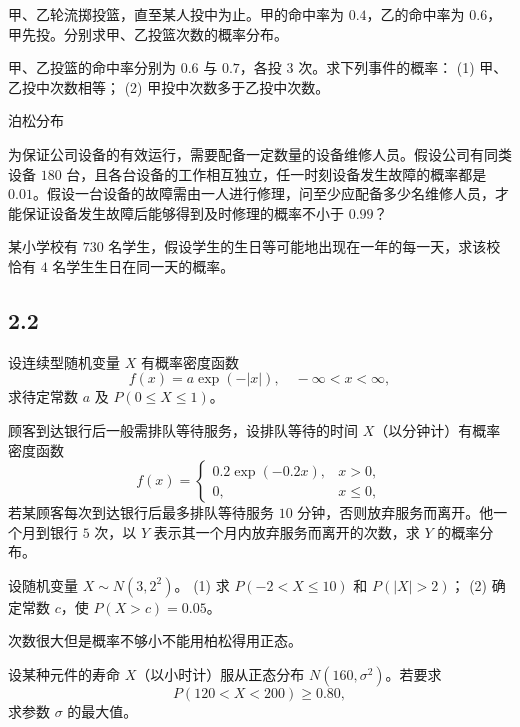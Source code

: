 \begin{homework}[2.5]
甲、乙轮流掷投篮，直至某人投中为止。甲的命中率为 $0.4$，乙的命中率为 $0.6$，甲先投。分别求甲、乙投篮次数的概率分布。
\end{homework}

\begin{homework}[2.9]
甲、乙投篮的命中率分别为 $0.6$ 与 $0.7$，各投 $3$ 次。求下列事件的概率：  
(1) 甲、乙投中次数相等；  
(2) 甲投中次数多于乙投中次数。
\end{homework}
\begin{dxtips}
泊松分布
\end{dxtips}
\begin{homework}[2.12]
为保证公司设备的有效运行，需要配备一定数量的设备维修人员。假设公司有同类设备 $180$ 台，且各台设备的工作相互独立，任一时刻设备发生故障的概率都是 $0.01$。假设一台设备的故障需由一人进行修理，问至少应配备多少名维修人员，才能保证设备发生故障后能够得到及时修理的概率不小于 $0.99$？
\end{homework}

\begin{homework}[2.13]
某小学校有 $730$ 名学生，假设学生的生日等可能地出现在一年的每一天，求该校恰有 $4$ 名学生生日在同一天的概率。
\end{homework}
\subsection*{2.2}

\begin{homework}[2.15]
设连续型随机变量 $X$ 有概率密度函数
\[
f(x) = a \exp(-|x|), \quad -\infty < x < \infty,
\]
求待定常数 $a$ 及 $P(0 \leq X \leq 1)$。
\end{homework}

\begin{homework}[2.17]
顾客到达银行后一般需排队等待服务，设排队等待的时间 $X$（以分钟计）有概率密度函数
\[
f(x) =
\begin{cases}
0.2 \exp(-0.2x), & x > 0, \\[6pt]
0, & x \leq 0,
\end{cases}
\]
若某顾客每次到达银行后最多排队等待服务 $10$ 分钟，否则放弃服务而离开。他一个月到银行 $5$ 次，以 $Y$ 表示其一个月内放弃服务而离开的次数，求 $Y$ 的概率分布。
\end{homework}

\begin{homework}[2.19]
设随机变量 $X \sim N(3, 2^2)$。  
(1) 求 $P(-2 < X \leq 10)$ 和 $P(|X| > 2)$；  
(2) 确定常数 $c$，使 $P(X > c) = 0.05$。
\end{homework}
\begin{dxtips}
    次数很大但是概率不够小不能用柏松得用正态。
\end{dxtips}
\begin{homework}[2.21]
设某种元件的寿命 $X$（以小时计）服从正态分布 $N(160,\sigma^2)$。若要求
\[
P(120 < X < 200) \geq 0.80,
\]
求参数 $\sigma$ 的最大值。
\end{homework}

